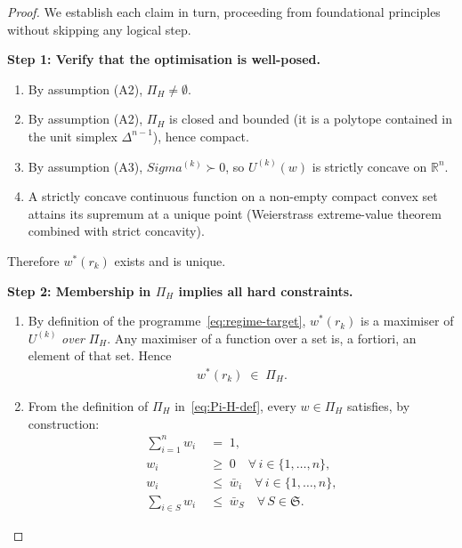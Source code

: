 \documentclass[12pt,openany]{book}
\newcommand{\bfw}{\mathbf{w}}
\newcommand{\bfSigma}{\boldsymbol{\Sigma}}
\numberwithin{equation}{chapter}
\theoremstyle{plain}
\theoremstyle{definition}
\theoremstyle{remark}
\def\mathcal#1{#1}%
\def\bfw{w}%
\def\bfSigma{Sigma}%
\begin{document}
\begin{proof}
We establish each claim in turn, proceeding from foundational
principles without skipping any logical step.

\medskip
\noindent
\textbf{Step 1: Verify that the optimisation is well-posed.}

\begin{enumerate}
  \item By assumption \textup{(A2)}, $\Pi_H \neq \emptyset$.

  \item By assumption \textup{(A2)}, $\Pi_H$ is closed and
        bounded (it is a polytope contained in the unit simplex
        $\Delta^{n-1}$), hence compact.

  \item By assumption \textup{(A3)}, $\bfSigma^{(k)} \succ 0$,
        so $\mathcal{U}^{(k)}(\bfw)$ is strictly concave on
        $\mathbb{R}^n$.

  \item A strictly concave continuous function on a non-empty
        compact convex set attains its supremum at a unique
        point (Weierstrass extreme-value theorem combined with
        strict concavity).
\end{enumerate}

Therefore $\bfw^{*}(r_k)$ exists and is unique.

\medskip
\noindent
\textbf{Step 2: Membership in $\Pi_H$ implies all hard
constraints.}

\begin{enumerate}
  \item By definition of the programme~\eqref{eq:regime-target},
        $\bfw^{*}(r_k)$ is a maximiser of $\mathcal{U}^{(k)}$
        \emph{over} $\Pi_H$.  Any maximiser of a function over
        a set is, a fortiori, an element of that set.  Hence
        \begin{align}
          \bfw^{*}(r_k) \;\in\; \Pi_H.
          \label{eq:membership}
        \end{align}

  \item From the definition of $\Pi_H$ in~\eqref{eq:Pi-H-def},
        every $\bfw \in \Pi_H$ satisfies, by construction:
        \begin{align}
          \textstyle\sum_{i=1}^{n} w_i
          &\;=\; 1,
          \label{eq:ph-budget}\\
          w_i
          &\;\geq\; 0
          \quad \forall\,i \in \{1,\dots,n\},
          \label{eq:ph-nn}\\
          w_i
          &\;\leq\; \bar{w}_i
          \quad \forall\,i \in \{1,\dots,n\},
          \label{eq:ph-cap}\\
          \textstyle\sum_{i \in \mathcal{S}} w_i
          &\;\leq\; \bar{w}_{\mathcal{S}}
          \quad \forall\,\mathcal{S} \in \mathfrak{S}.
          \label{eq:ph-group}
        \end{align}


\end{enumerate}
\end{proof}
\end{document}
